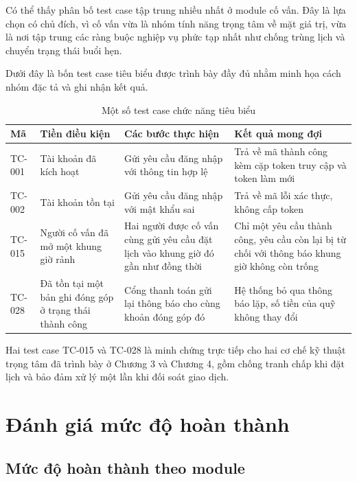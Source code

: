 \documentclass[12pt,a4paper,oneside]{report}
\begin{document}
Có thể thấy phân bố test case tập trung nhiều nhất ở module cố vấn. Đây là lựa chọn có chủ đích, vì cố vấn vừa là nhóm tính năng trọng tâm về mặt giá trị, vừa là nơi tập trung các ràng buộc nghiệp vụ phức tạp nhất như chống trùng lịch và chuyển trạng thái buổi hẹn.

Dưới đây là bốn test case tiêu biểu được trình bày đầy đủ nhằm minh họa cách nhóm đặc tả và ghi nhận kết quả.

\renewcommand{\arraystretch}{1.25}
\begin{table}[H]
\centering
\small
\caption{Một số test case chức năng tiêu biểu}
\label{tab:sampletc}
\begin{tabular}{|>{\raggedright\arraybackslash}p{1.5cm}|>{\raggedright\arraybackslash}p{3.4cm}|>{\raggedright\arraybackslash}p{4.4cm}|>{\raggedright\arraybackslash}p{4.2cm}|}
\hline
\textbf{Mã} & \textbf{Tiền điều kiện} & \textbf{Các bước thực hiện} & \textbf{Kết quả mong đợi} \\ \hline
TC-001 & Tài khoản đã kích hoạt & Gửi yêu cầu đăng nhập với thông tin hợp lệ & Trả về mã thành công kèm cặp token truy cập và token làm mới \\ \hline
TC-002 & Tài khoản tồn tại & Gửi yêu cầu đăng nhập với mật khẩu sai & Trả về mã lỗi xác thực, không cấp token \\ \hline
TC-015 & Người cố vấn đã mở một khung giờ rảnh & Hai người được cố vấn cùng gửi yêu cầu đặt lịch vào khung giờ đó gần như đồng thời & Chỉ một yêu cầu thành công, yêu cầu còn lại bị từ chối với thông báo khung giờ không còn trống \\ \hline
TC-028 & Đã tồn tại một bản ghi đóng góp ở trạng thái thành công & Cổng thanh toán gửi lại thông báo cho cùng khoản đóng góp đó & Hệ thống bỏ qua thông báo lặp, số tiền của quỹ không thay đổi \\ \hline
\end{tabular}
\end{table}
\renewcommand{\arraystretch}{1}

Hai test case TC-015 và TC-028 là minh chứng trực tiếp cho hai cơ chế kỹ thuật trọng tâm đã trình bày ở Chương 3 và Chương 4, gồm chống tranh chấp khi đặt lịch và bảo đảm xử lý một lần khi đối soát giao dịch.

\section{Đánh giá mức độ hoàn thành}

\subsection{Mức độ hoàn thành theo module}
\end{document}
